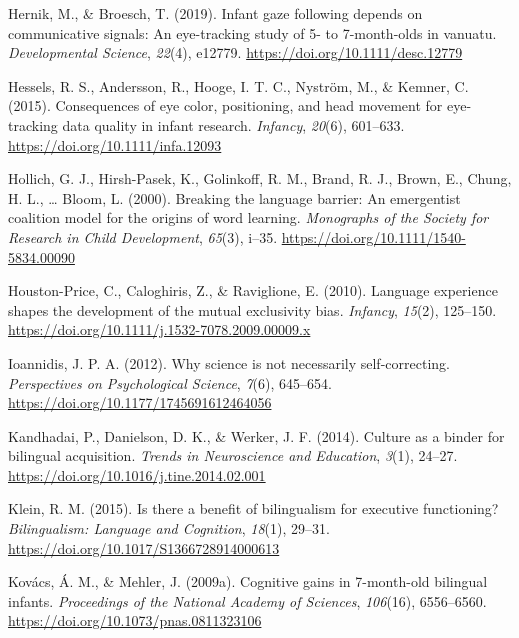 \documentclass[english,,man,floatsintext]{apa6}
\begin{document}
\leavevmode\hypertarget{ref-Hernik_Broesch_2019}{}%
Hernik, M., \& Broesch, T. (2019). Infant gaze following depends on communicative signals: An eye-tracking study of 5- to 7-month-olds in vanuatu. \emph{Developmental Science}, \emph{22}(4), e12779. \url{https://doi.org/10.1111/desc.12779}

\leavevmode\hypertarget{ref-Hessels_etal_2015}{}%
Hessels, R. S., Andersson, R., Hooge, I. T. C., Nyström, M., \& Kemner, C. (2015). Consequences of eye color, positioning, and head movement for eye-tracking data quality in infant research. \emph{Infancy}, \emph{20}(6), 601--633. \url{https://doi.org/10.1111/infa.12093}

\leavevmode\hypertarget{ref-Hollich_etal_2000}{}%
Hollich, G. J., Hirsh-Pasek, K., Golinkoff, R. M., Brand, R. J., Brown, E., Chung, H. L., \ldots{} Bloom, L. (2000). Breaking the language barrier: An emergentist coalition model for the origins of word learning. \emph{Monographs of the Society for Research in Child Development}, \emph{65}(3), i--35. \url{https://doi.org/10.1111/1540-5834.00090}

\leavevmode\hypertarget{ref-Houston-Price_etal_2010}{}%
Houston-Price, C., Caloghiris, Z., \& Raviglione, E. (2010). Language experience shapes the development of the mutual exclusivity bias. \emph{Infancy}, \emph{15}(2), 125--150. \url{https://doi.org/10.1111/j.1532-7078.2009.00009.x}

\leavevmode\hypertarget{ref-Ioannidis_2012}{}%
Ioannidis, J. P. A. (2012). Why science is not necessarily self-correcting. \emph{Perspectives on Psychological Science}, \emph{7}(6), 645--654. \url{https://doi.org/10.1177/1745691612464056}

\leavevmode\hypertarget{ref-Kandhadai_etal_2014}{}%
Kandhadai, P., Danielson, D. K., \& Werker, J. F. (2014). Culture as a binder for bilingual acquisition. \emph{Trends in Neuroscience and Education}, \emph{3}(1), 24--27. \url{https://doi.org/10.1016/j.tine.2014.02.001}

\leavevmode\hypertarget{ref-Klein_2015}{}%
Klein, R. M. (2015). Is there a benefit of bilingualism for executive functioning? \emph{Bilingualism: Language and Cognition}, \emph{18}(1), 29--31. \url{https://doi.org/10.1017/S1366728914000613}

\leavevmode\hypertarget{ref-Kovacs_Mehler_2009b}{}%
Kovács, Á. M., \& Mehler, J. (2009a). Cognitive gains in 7-month-old bilingual infants. \emph{Proceedings of the National Academy of Sciences}, \emph{106}(16), 6556--6560. \url{https://doi.org/10.1073/pnas.0811323106}
\end{document}
